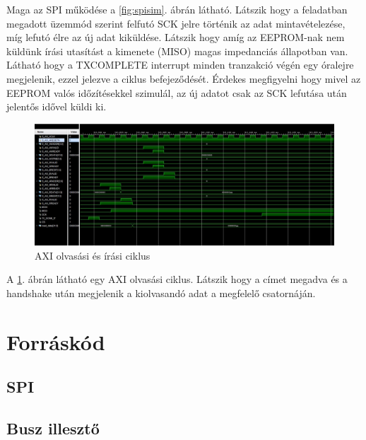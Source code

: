 \documentclass[a4paper,11pt]{article}
\begin{document}
Maga az SPI működése a \ref{fig:spisim}. ábrán látható. Látszik hogy a feladatban megadott üzemmód szerint felfutó SCK jelre történik az adat mintavételezése, míg lefutó élre az új adat kiküldése. Látszik hogy amíg az EEPROM-nak nem küldünk írási utasítást a kimenete (MISO) magas impedanciás állapotban van. Látható hogy a TXCOMPLETE interrupt minden tranzakció végén egy óralejre megjelenik, ezzel jelezve a ciklus befejeződését. Érdekes megfigyelni hogy mivel az EEPROM valós időzítésekkel szimulál, az új adatot csak az SCK lefutása után jelentős idővel küldi ki.

\begin{figure}[H]
	\begin{center}
	\includegraphics[scale=0.49]{axi_read.JPG}
	\caption{AXI olvasási és írási ciklus}
	\label{fig:axi_read}
	\end{center}
	
\end{figure}

A \ref{fig:axi_read}. ábrán látható egy AXI olvasási ciklus. Látszik hogy a címet megadva és a handshake után megjelenik a kiolvasandó adat a megfelelő csatornáján.

\section{Forráskód}

\subsection{SPI}



\subsection{Busz illesztő}
\end{document}
